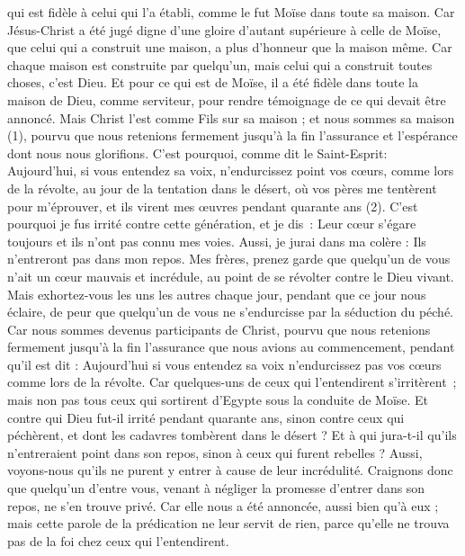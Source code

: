 \begin{multicols}{2}
qui est fidèle à celui qui l'a établi, comme le fut Moïse dans toute sa maison.
Car Jésus-Christ a été jugé digne d'une gloire d'autant supérieure à celle de Moïse, que celui qui a construit une maison, a plus d’honneur que la maison même.
Car chaque maison est construite par quelqu'un, mais celui qui a construit toutes choses, c'est Dieu.
Et pour ce qui est de Moïse, il a été fidèle dans toute la maison de Dieu, comme serviteur, pour rendre témoignage de ce qui devait être annoncé.
Mais Christ l’est comme Fils sur sa maison ; et nous sommes sa maison (1), pourvu que nous retenions fermement jusqu’à la fin l'assurance et l'espérance dont nous nous glorifions.
C'est pourquoi, comme dit le Saint-Esprit: Aujourd'hui, si vous entendez sa voix,
n'endurcissez point vos cœurs, comme lors de la révolte, au jour de la tentation dans le désert,
où vos pères me tentèrent pour m’éprouver, et ils virent mes œuvres pendant quarante ans (2).
C'est pourquoi je fus irrité contre cette génération, et je dis : Leur cœur s'égare toujours et ils n'ont pas connu mes voies.
Aussi, je jurai dans ma colère : Ils n’entreront pas dans mon repos.
Mes frères, prenez garde que quelqu'un de vous n’ait un cœur mauvais et incrédule, au point de se révolter contre le Dieu vivant.
Mais exhortez-vous les uns les autres chaque jour, pendant que ce jour nous éclaire, de peur que quelqu'un de vous ne s'endurcisse par la séduction du péché.
Car nous sommes devenus participants de Christ, pourvu que nous retenions fermement jusqu'à la fin l’assurance que nous avions au commencement,
pendant qu'il est dit : Aujourd'hui si vous entendez sa voix n'endurcissez pas vos cœurs comme lors de la révolte.
Car quelques-uns de ceux qui l’entendirent s’irritèrent ; mais non pas tous ceux qui sortirent d’Egypte sous la conduite de Moïse.
Et contre qui Dieu fut-il irrité pendant quarante ans, sinon contre ceux qui péchèrent, et dont les cadavres tombèrent dans le désert ?
Et à qui jura-t-il qu'ils n'entreraient point dans son repos, sinon à ceux qui furent rebelles ?
Aussi, voyons-nous qu'ils ne purent y entrer à cause de leur incrédulité.
\VerseOne{}Craignons donc que quelqu'un d'entre vous, venant à négliger la promesse d'entrer dans son repos, ne s'en trouve privé.
Car elle nous a été annoncée, aussi bien qu’à eux ; mais cette parole de la prédication ne leur servit de rien, parce qu'elle ne trouva pas de la foi chez ceux qui l’entendirent.

\end{multicols}
